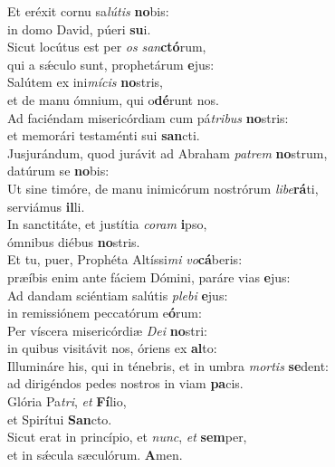 \evenverse Et eréxit cornu sa\textit{lú}\textit{tis} \textbf{no}bis:~\*\\
\evenverse in domo David, púeri \textbf{su}i.\\
\oddverse Sicut locútus est per \textit{os} \textit{san}\textbf{ctó}rum,~\*\\
\oddverse qui a sǽculo sunt, prophetárum \textbf{e}jus:\\
\evenverse Salútem ex ini\textit{mí}\textit{cis} \textbf{no}stris,~\*\\
\evenverse et de manu ómnium, qui o\textbf{dé}runt nos.\\
\oddverse Ad faciéndam misericórdiam cum pá\textit{tri}\textit{bus} \textbf{no}stris:~\*\\
\oddverse et memorári testaménti sui \textbf{san}cti.\\
\evenverse Jusjurándum, quod jurávit ad Abraham \textit{pa}\textit{trem} \textbf{no}strum,~\*\\
\evenverse datúrum se \textbf{no}bis:\\
\oddverse Ut sine timóre, de manu inimicórum nostrórum \textit{li}\textit{be}\textbf{rá}ti,~\*\\
\oddverse serviámus \textbf{il}li.\\
\evenverse In sanctitáte, et justítia \textit{co}\textit{ram} \textbf{i}pso,~\*\\
\evenverse ómnibus diébus \textbf{no}stris.\\
\oddverse Et tu, puer, Prophéta Altíssi\textit{mi} \textit{vo}\textbf{cá}beris:~\*\\
\oddverse præíbis enim ante fáciem Dómini, paráre vias \textbf{e}jus:\\
\evenverse Ad dandam sciéntiam salútis \textit{ple}\textit{bi} \textbf{e}jus:~\*\\
\evenverse in remissiónem peccatórum e\textbf{ó}rum:\\
\oddverse Per víscera misericórdiæ \textit{De}\textit{i} \textbf{no}stri:~\*\\
\oddverse in quibus visitávit nos, óriens ex \textbf{al}to:\\
\evenverse Illumináre his, qui in ténebris, et in umbra \textit{mor}\textit{tis} \textbf{se}dent:~\*\\
\evenverse ad dirigéndos pedes nostros in viam \textbf{pa}cis.\\
\oddverse Glória Pa\textit{tri}, \textit{et} \textbf{Fí}lio,~\*\\
\oddverse et Spirítui \textbf{San}cto.\\
\evenverse Sicut erat in princípio, et \textit{nunc}, \textit{et} \textbf{sem}per,~\*\\
\evenverse et in sǽcula sæculórum. \textbf{A}men.\\
